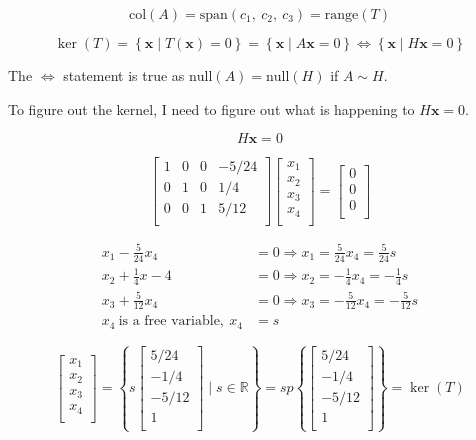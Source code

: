 \documentclass[12pt]{article}
\theoremstyle{plain}
\theoremstyle{remark}
\theoremstyle{definition}
\begin{document}
\[\text{col}(A) = \text{span}\left( c_{1},\ c_{2},\ c_{3} \right) = \text{range}(T)\]

\[\ker(T) = \left\{ \mathbf{x}\mid T\left( \mathbf{x} \right) = 0 \right\} = \left\{ \mathbf{x}\mid A\mathbf{x} = 0 \right\} \Leftrightarrow \left\{ \mathbf{x}\mid H\mathbf{x} = 0 \right\}\]

The \(\Leftrightarrow\) statement is true as
\(\text{null}{(A)} = \text{null}(H)\) if \(A\sim H\).

To figure out the kernel, I need to figure out what is happening to
\(H\mathbf{x} = 0\).

\[H\mathbf{x} = 0\]

\[\begin{bmatrix}
1 & 0 & 0 & - 5/24 \\
0 & 1 & 0 & 1/4 \\
0 & 0 & 1 & 5/12 \\
\end{bmatrix}\begin{bmatrix}
x_{1} \\
x_{2} \\
x_{3} \\
x_{4} \\
\end{bmatrix} = \begin{bmatrix}
0 \\
0 \\
0 \\
\end{bmatrix}\]

\begin{align*}
x_{1} - \frac{5}{24}x_{4} &= 0 \Rightarrow x_{1} = \frac{5}{24}x_{4} = \frac{5}{24}s \\
x_{2} + \frac{1}{4}x - 4 &= 0 \Rightarrow x_{2} = - \frac{1}{4}x_{4} = - \frac{1}{4}s \\
x_{3} + \frac{5}{12}x_{4} &= 0 \Rightarrow x_{3} = - \frac{5}{12}x_{4} = - \frac{5}{12}s \\
x_{4}\ \text{is\ a\ free\ variable},\ x_{4} &= s
\end{align*}


\[\begin{bmatrix}
x_{1} \\
x_{2} \\
x_{3} \\
x_{4} \\
\end{bmatrix} = \left\{ s\begin{bmatrix}
5/24 \\
 - 1/4 \\
 - 5/12 \\
1 \\
\end{bmatrix}\mid s\mathbb{\in R} \right\} = sp\left\{ \begin{bmatrix}
5/24 \\
 - 1/4 \\
 - 5/12 \\
1 \\
\end{bmatrix} \right\} = \ker(T)\]
\end{document}
